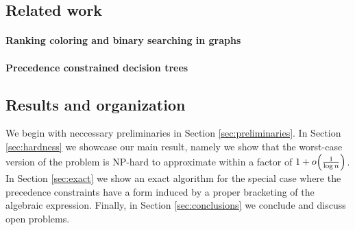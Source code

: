 \subsection{Related work}
\label{subsec:related-work}

\paragraph*{Ranking coloring and binary searching in graphs}

\paragraph*{Precedence constrained decision trees}

\subsection{Results and organization}
\label{subsec:results-organization}

We begin with neccessary preliminaries in Section \ref{sec:preliminaries}. In Section \ref{sec:hardness} we showcase our main result, namely we show that the worst-case version of the problem is NP-hard to approximate within a factor of $1+o\mathopen{}\left( \frac{1}{\log n} \right)$. In Section \ref{sec:exact} we show an exact algorithm for the special case where the precedence constraints have a form induced by a proper bracketing of the algebraic expression. Finally, in Section \ref{sec:conclusions} we conclude and discuss open problems.
